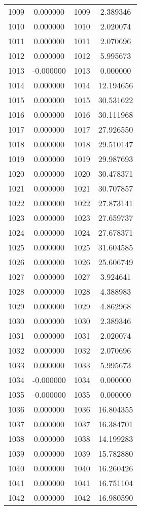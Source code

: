 \documentclass[12pt]{article}
\begin{document}
\begin{longtable}{@{}cccc@{}}
1009 & 0.000000 & 1009 & 2.389346 \\
1010 & 0.000000 & 1010 & 2.020074 \\
1011 & 0.000000 & 1011 & 2.070696 \\
1012 & 0.000000 & 1012 & 5.995673 \\
1013 & -0.000000 & 1013 & 0.000000 \\
1014 & 0.000000 & 1014 & 12.194656 \\
1015 & 0.000000 & 1015 & 30.531622 \\
1016 & 0.000000 & 1016 & 30.111968 \\
1017 & 0.000000 & 1017 & 27.926550 \\
1018 & 0.000000 & 1018 & 29.510147 \\
1019 & 0.000000 & 1019 & 29.987693 \\
1020 & 0.000000 & 1020 & 30.478371 \\
1021 & 0.000000 & 1021 & 30.707857 \\
1022 & 0.000000 & 1022 & 27.873141 \\
1023 & 0.000000 & 1023 & 27.659737 \\
1024 & 0.000000 & 1024 & 27.678371 \\
1025 & 0.000000 & 1025 & 31.604585 \\
1026 & 0.000000 & 1026 & 25.606749 \\
1027 & 0.000000 & 1027 & 3.924641 \\
1028 & 0.000000 & 1028 & 4.388983 \\
1029 & 0.000000 & 1029 & 4.862968 \\
1030 & 0.000000 & 1030 & 2.389346 \\
1031 & 0.000000 & 1031 & 2.020074 \\
1032 & 0.000000 & 1032 & 2.070696 \\
1033 & 0.000000 & 1033 & 5.995673 \\
1034 & -0.000000 & 1034 & 0.000000 \\
1035 & -0.000000 & 1035 & 0.000000 \\
1036 & 0.000000 & 1036 & 16.804355 \\
1037 & 0.000000 & 1037 & 16.384701 \\
1038 & 0.000000 & 1038 & 14.199283 \\
1039 & 0.000000 & 1039 & 15.782880 \\
1040 & 0.000000 & 1040 & 16.260426 \\
1041 & 0.000000 & 1041 & 16.751104 \\
1042 & 0.000000 & 1042 & 16.980590 \\

\end{longtable}
\end{document}
